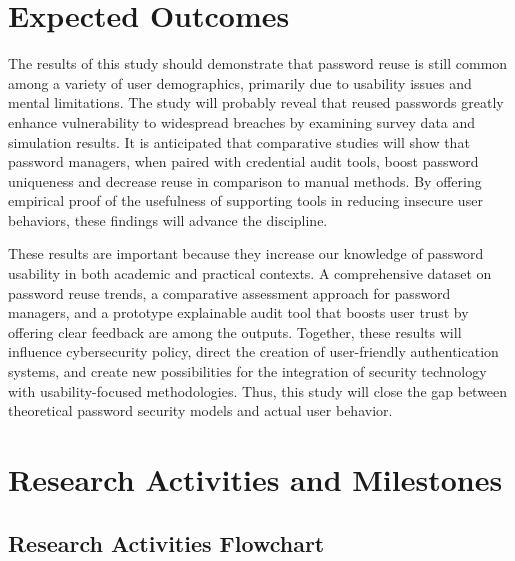 \documentclass[a4paper, 12pt]{article}
\begin{document}
\section{Expected Outcomes}
The results of this study should demonstrate that password reuse is still common among a variety of user demographics, primarily due to usability issues and mental limitations. The study will probably reveal that reused passwords greatly enhance vulnerability to widespread breaches by examining survey data and simulation results. It is anticipated that comparative studies will show that password managers, when paired with credential audit tools, boost password uniqueness and decrease reuse in comparison to manual methods. By offering empirical proof of the usefulness of supporting tools in reducing insecure user behaviors, these findings will advance the discipline.

\par These results are important because they increase our knowledge of password usability in both academic and practical contexts. A comprehensive dataset on password reuse trends, a comparative assessment approach for password managers, and a prototype explainable audit tool that boosts user trust by offering clear feedback are among the outputs. Together, these results will influence cybersecurity policy, direct the creation of user-friendly authentication systems, and create new possibilities for the integration of security technology with usability-focused methodologies. Thus, this study will close the gap between theoretical password security models and actual user behavior.

\newpage

\section{Research Activities and Milestones}

\subsection{Research Activities Flowchart}


\usetikzlibrary{shapes.geometric, positioning}
\end{document}
